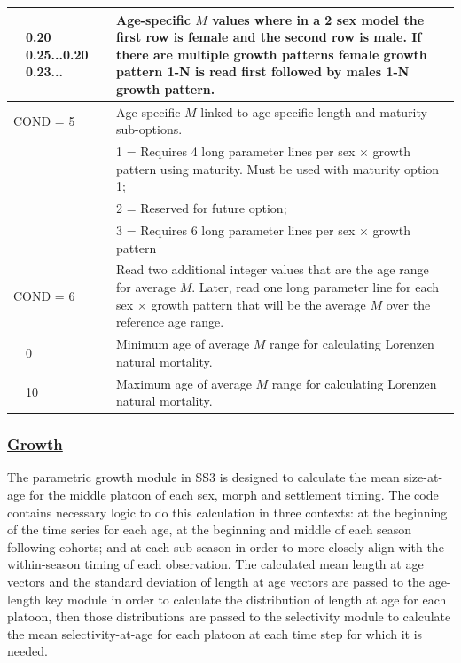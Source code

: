 \begin{longtable}{p{0.5cm} p{2cm} p{12.75cm}}
	& 0.20 0.25...0.20 0.23... & Age-specific $M$ values where in a 2 sex model the first row is female and the second row is male. If there are multiple growth patterns female growth pattern 1-N is read first followed by males 1-N growth pattern. \Bstrut\\
	\hline
	
	\multicolumn{2}{l}{COND = 5} \Tstrut & Age-specific $M$ linked to age-specific length and maturity sub-options. \\

	&  & 1 = Requires 4 long parameter lines per sex $\times$ growth pattern using maturity. Must be used with maturity option 1; \\
	&  & 2 = Reserved for future option; \\
	&  & 3 = Requires 6 long parameter lines per sex $\times$ growth pattern \Bstrut\\
	\hline

	\multicolumn{2}{l}{COND = 6} \Tstrut & Read two additional integer values that are the age range for average $M$. Later, read one long parameter line for each sex $\times$ growth pattern that will be the average $M$ over the reference age range. \\
	& 0 \Tstrut & Minimum age of average $M$ range for calculating Lorenzen natural mortality. \\
	& 10 \Tstrut & Maximum age of average $M$ range for calculating Lorenzen natural mortality. \\ 
	\hline
\end{longtable}

\hypertarget{Growth}{}
\subsubsection[Growth]{\protect\hyperlink{Growth}{Growth}}

The parametric growth module in SS3 is designed to calculate the mean size-at-age for the middle platoon of each sex, morph and settlement timing. The code contains necessary logic to do this calculation in three contexts: at the beginning of the time series for each age, at the beginning and middle of each season following cohorts; and at each sub-season in order to more closely align with the within-season timing of each observation. The calculated mean length at age vectors and the standard deviation of length at age vectors are passed to the age-length key module in order to calculate the distribution of length at age for each platoon, then those distributions are passed to the selectivity module to calculate the mean selectivity-at-age for each platoon at each time step for which it is needed.

